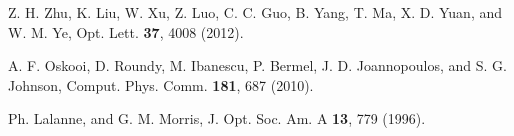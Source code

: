 \documentclass[10pt,letterpaper,twocolumn]{article} %
\begin{document}
\begin{thebibliography}{10}
Z. H. Zhu, K. Liu, W. Xu, Z. Luo, C. C. Guo, B. Yang, T. Ma, X. D. Yuan, and W. M. Ye, 
Opt. Lett. \textbf{37}, 4008 (2012).


A. F. Oskooi, D. Roundy, M. Ibanescu, P. Bermel, J. D. Joannopoulos, and S. G. Johnson, 
Comput. Phys. Comm. \textbf{181}, 687 (2010).

Ph. Lalanne, and G. M. Morris,
J. Opt. Soc. Am. A \textbf{13}, 779 (1996). 

\end{thebibliography}
\end{document}
